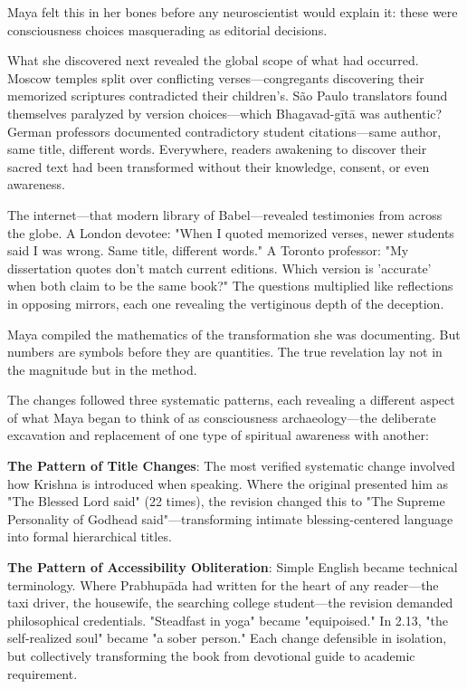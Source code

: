 \documentclass[12pt,twoside]{book}
\begin{document}
Maya felt this in her bones before any neuroscientist would explain it: these were consciousness choices masquerading as editorial decisions.

What she discovered next revealed the global scope of what had occurred. Moscow temples split over conflicting verses—congregants discovering their memorized scriptures contradicted their children's. São Paulo translators found themselves paralyzed by version choices—which Bhagavad-gītā was authentic? German professors documented contradictory student citations—same author, same title, different words. Everywhere, readers awakening to discover their sacred text had been transformed without their knowledge, consent, or even awareness.

The internet—that modern library of Babel—revealed testimonies from across the globe. A London devotee: "When I quoted memorized verses, newer students said I was wrong. Same title, different words." A Toronto professor: "My dissertation quotes don't match current editions. Which version is 'accurate' when both claim to be the same book?" The questions multiplied like reflections in opposing mirrors, each one revealing the vertiginous depth of the deception.

Maya compiled the mathematics of the transformation she was documenting. But numbers are symbols before they are quantities. The true revelation lay not in the magnitude but in the method.

The changes followed three systematic patterns, each revealing a different aspect of what Maya began to think of as consciousness archaeology—the deliberate excavation and replacement of one type of spiritual awareness with another:

\textbf{\textbf{The Pattern of Title Changes}}: The most verified systematic change involved how Krishna is introduced when speaking. Where the original presented him as "The Blessed Lord said" (22 times), the revision changed this to "The Supreme Personality of Godhead said"—transforming intimate blessing-centered language into formal hierarchical titles.

\textbf{\textbf{The Pattern of Accessibility Obliteration}}: Simple English became technical terminology. Where Prabhupāda had written for the heart of any reader—the taxi driver, the housewife, the searching college student—the revision demanded philosophical credentials. "Steadfast in yoga" became "equipoised." In 2.13, "the self-realized soul" became "a sober person." Each change defensible in isolation, but collectively transforming the book from devotional guide to academic requirement.
\end{document}
